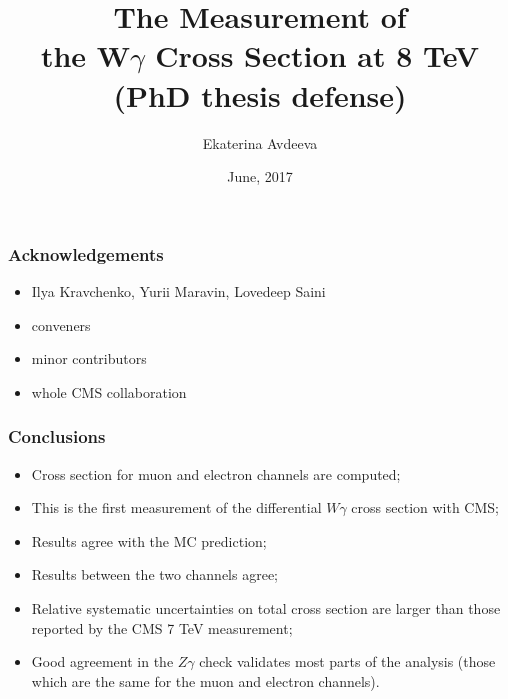 \documentclass{beamer}
\title{The Measurement of \\ the W$\gamma$ Cross Section at 8 TeV \\ (PhD thesis defense) }
\author{Ekaterina Avdeeva}
\institute{University of Nebraska - Lincoln}
\date{June, 2017}
\begin{document}
\begin{frame}
\titlepage %
\end{frame}


\begin{frame}\frametitle{Acknowledgements} %
  \scriptsize
  \begin{itemize}
     \item Ilya Kravchenko, Yurii Maravin, Lovedeep Saini
     \item conveners
     \item minor contributors
     \item whole CMS collaboration
  \end{itemize}
\end{frame}%
 

\begin{frame}\frametitle{Conclusions} %
  \scriptsize
  \begin{itemize}
     \item Cross section for muon and electron channels are computed; 
     \item This is the first measurement of the differential $W\gamma$ cross section with CMS;
     \item Results agree with the MC prediction;
     \item Results between the two channels agree;
     \item Relative systematic uncertainties on total cross section are larger than those reported by the CMS 7 TeV measurement;
     \item Good agreement in the $Z\gamma$ check validates most parts of the analysis (those which are the same for the muon and electron channels).
  \end{itemize}
\end{frame}%

%
\end{document}
